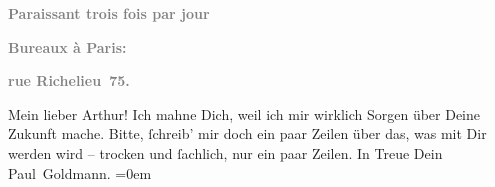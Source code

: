 \begin{ledgroupsized}[t]{13cm}
           \pstart
           \begin{otherlanguage}{french}\textcolor{gray}{\textbf{\textbf{Paraissant trois fois par jour}}}\end{otherlanguage}\pend
           \pstart
           \begin{otherlanguage}{french}\textcolor{gray}{\textbf{\textbf{Bureaux à Paris:}}}\end{otherlanguage}\pend
           \pstart
           \begin{otherlanguage}{french}\textcolor{gray}{\textbf{\textbf{rue Richelieu 75.}}}\end{otherlanguage}\pend
           \pstart
           Mein lieber Arthur!\pend
           \pstart
           Ich mahne Dich, weil ich mir wirklich Sorgen über Deine Zukunft mache. Bitte,
               ſchreib’ mir doch ein paar Zeilen über das, was mit Dir werden wird – trocken und
               ſachlich, nur ein paar Zeilen. In Treue\pend
           \pstart
           Dein {\\[\baselineskip]}\spacefill\mbox{Paul Goldmann.}\pend
           \leftskip=0em{}\endnumbering{}\end{ledgroupsized}\begin{anhang}\end{anhang}\newcommand{\dateiname}{L02707}\newcommand{\titel}{Paul Goldmann an Arthur Schnitzler, 9. 5. [1893]}\newcommand{\editorInnen}{Martin Anton Müller und Laura Untner}
      